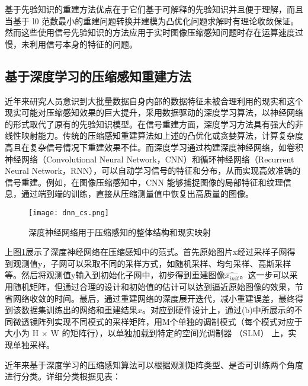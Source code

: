 基于先验知识的重建方法优点在于它们基于可解释的先验知识并且便于理解，而且当基于 l0 范数最小的重建问题转换并建模为凸优化问题求解时有理论收敛保证。然而这些使用信号先验知识的方法应用于实时图像压缩感知问题时存在运算速度过慢，未利用信号本身的特征的问题。

\subsection{基于深度学习的压缩感知重建方法}
近年来研究人员意识到大批量数据自身内部的数据特征未被合理利用的现实和这个现实可能对压缩感知效果的巨大提升，采用数据驱动的深度学习算法，以神经网络的形式取代了原有的先验知识模型。在信号重建方面，深度学习方法具有强大的非线性映射能力。传统的压缩感知重建算法如上述的凸优化或贪婪算法，计算复杂度高且在复杂信号情况下重建效果不佳。而深度学习通过构建深度神经网络，如卷积神经网络（Convolutional Neural Network，CNN）\citep{Neocognitron,LeNet,AlexNet,ZFNet}和循环神经网络（Recurrent Neural Network，RNN）\citep{Hopfield,Elman,BPTT}，可以自动学习信号的特征和分布，从而实现高效准确的信号重建。例如，在图像压缩感知中，CNN 能够捕捉图像的局部特征和纹理信息，通过端到端的训练，直接从压缩测量值中恢复出高质量的图像。

\begin{figure}[ht]
  \centering
  \texttt{[image: dnn\_cs.png]}
  \caption{深度神经网络用于压缩感知的整体结构和现实映射\cite{Practical_compact_deep_compressed_sensing}}
  \label{fig:dnn_cs}
\end{figure}

上图\ref{fig:dnn_cs}展示了深度神经网络在压缩感知中的范式。首先原始图片x经过采样子网得到观测值y，子网可以采取不同的采样方式，如随机采样、均匀采样、高斯采样等。然后将观测值y输入到初始化子网中，初步得到重建图像$\hat{x_{init}}$。这一步可以采用随机矩阵，但通过合理的设计和初始值的估计可以达到逼近原始图像的效果，节省网络收敛的时间。最后，通过重建网络的深度展开迭代，减小重建误差，最终得到该数据集训练出的网络和重建结果$\hat{x}$。对应到硬件设计上，通过(b)中所展示的不同微透镜阵列实现不同模式的采样矩阵，用M个单独的调制模式（每个模式对应于大小为 H × W 的矩阵行），以单独加载到特定的空间光调制器 （SLM） 上，实现单独采样。

近年来基于深度学习的压缩感知算法可以根据观测矩阵类型、是否可训练两个角度进行分类。详细分类根据\cite{Practical_compact_deep_compressed_sensing}见表：

